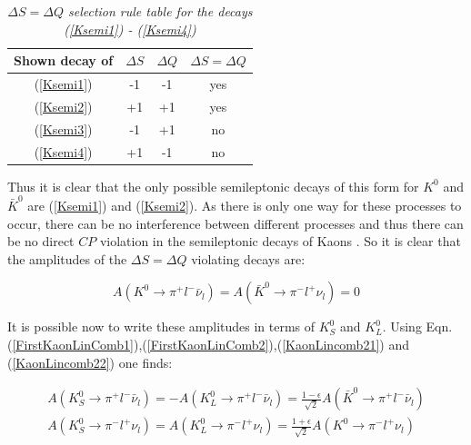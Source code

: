 \begin{table}[h!]
\caption{\textit{$\Delta S = \Delta Q$ selection rule table for the decays (\ref{Ksemi1}) - (\ref{Ksemi4})}}
\centering
\setlength{\tabcolsep}{10pt}
\begin{tabular}{c| ccc}
\hline
Shown decay of  & $\Delta S$ & $\Delta Q$ & $\Delta S = \Delta Q$ \\ 
\hline \hline
(\ref{Ksemi1})  &     -1     &     -1     & yes                   \\
(\ref{Ksemi2})  &     +1     &     +1     & yes                   \\
(\ref{Ksemi3})  &     -1     &     +1     & no                    \\
(\ref{Ksemi4})  &     +1     &     -1     & no                    \\
\hline
\end{tabular} 
\label{DeltaSQruleKsemi}
\end{table}

\noindent Thus it is clear that the only possible semileptonic decays of this form for $K^{0}$ and $\bar{K}^{0}$ are (\ref{Ksemi1}) and (\ref{Ksemi2}). As there is only one way for these processes to occur, there can be no interference between different processes and thus there can be no direct $CP$ violation in the semileptonic decays of Kaons \cite[pg. 10]{DAmbrosio}. So it is clear that the amplitudes of the $\Delta S = \Delta Q$ violating decays are:

\begin{equation*}
A(K^{0} \rightarrow \pi^{+} l^{-} \bar{\nu}_{l}) = A(\bar{K}^{0} \rightarrow \pi^{-} l^{+} \nu_{l}) = 0  
\end{equation*}

It is possible now to write these amplitudes in terms of $K^{0}_{S}$ and $K^{0}_{L}$. Using Eqn.(\ref{FirstKaonLinComb1}),(\ref{FirstKaonLinComb2}),(\ref{KaonLincomb21}) and (\ref{KaonLincomb22}) one finds\cite[pg. 11]{DAmbrosio}:

\begin{align*}
A({K}^{0}_{S} \rightarrow \pi^{+} l^{-} \bar{\nu}_{l}) = - A(K^{0}_{L} \rightarrow \pi^{+} l^{-} \bar{\nu}_{l}) = \frac{1 - \epsilon}{\sqrt{2}} A(\bar{K}^{0} \rightarrow \pi^{+} l^{-} \bar{\nu}_{l}) \\  
A({K}^{0}_{S} \rightarrow \pi^{-} l^{+} \nu_{l}) = A(K^{0}_{L} \rightarrow \pi^{-} l^{+} \nu_{l}) = \frac{1 + \epsilon}{\sqrt{2}} A(K^{0} \rightarrow \pi^{-} l^{+} \nu_{l})   
\end{align*}

